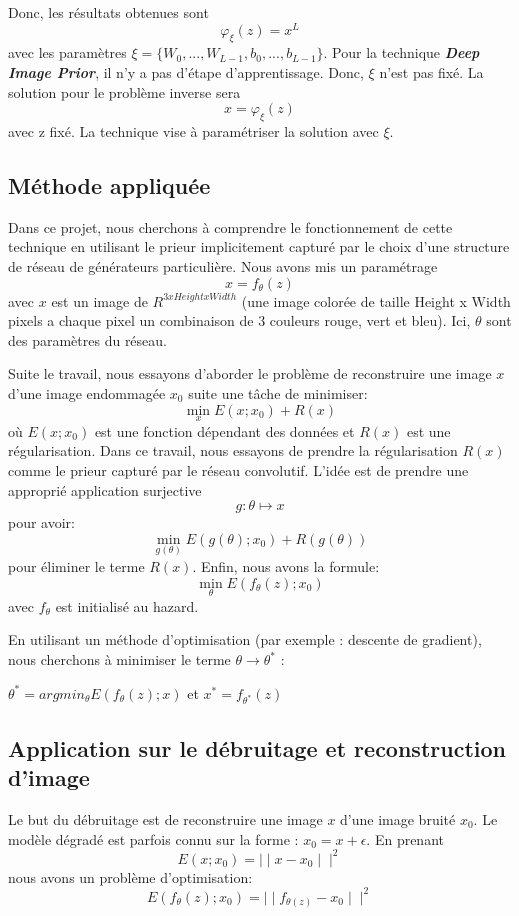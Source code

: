 \documentclass[
  12pt,
  dvipsnames]{article}
\begin{document}
Donc, les résultats obtenues sont \[\varphi_\xi(z) = x^L\] avec les paramètres \(\xi = \{W_0,...,W_{L-1},b_0,...,b_{L-1}\}\).
Pour la technique \textbf{\emph{Deep Image Prior}}, il n'y a pas d'étape d'apprentissage. Donc, \(\xi\) n'est pas fixé.
La solution pour le problème inverse sera \[x=\varphi_\xi(z)\] avec z fixé. La technique vise à paramétriser la solution avec \(\xi\).

\hypertarget{muxe9thode-appliquuxe9e}{%
\subsection{Méthode appliquée}\label{muxe9thode-appliquuxe9e}}

Dans ce projet, nous cherchons à comprendre le fonctionnement de cette technique
en utilisant le prieur implicitement capturé par le choix d'une structure de réseau de générateurs particulière.
Nous avons mis un paramétrage \[x = f_\theta(z)\] avec \(x\) est un image de \(R^{3xHeightxWidth}\) (une image colorée de taille
Height x Width pixels a chaque pixel un combinaison de 3 couleurs rouge, vert et bleu).
Ici, \(\theta\) sont des paramètres du réseau.

Suite le travail, nous essayons d'aborder le problème de reconstruire une image \(x\) d'une image endommagée \(x_0\) suite une tâche de minimiser: \[\min_{x} E(x;x_0) + R(x)\] où \(E(x;x_0)\) est une fonction dépendant des données et \(R(x)\) est une régularisation. Dans ce travail, nous essayons de prendre la régularisation \(R(x)\) comme le prieur capturé par le réseau convolutif. L'idée est de prendre une approprié application surjective \[g: \theta \mapsto x\] pour avoir: \[\min_{g(\theta)} E(g(\theta);x_0) + R(g(\theta))\] pour éliminer le terme \(R(x)\). Enfin, nous avons la formule: \[\min_{\theta} E(f_{\theta}(z);x_0)\] avec \(f_{\theta}\) est initialisé au hazard.

En utilisant un méthode d'optimisation (par exemple : descente de gradient), nous cherchons à minimiser le terme \(\theta \rightarrow \theta^*\) :

\begin {center} $\theta ^* = argmin_{\theta} E(f_{\theta}(z);x)$ et $x^* = f_{\theta^*}(z)$ \end {center}

\hypertarget{application-sur-le-duxe9bruitage-et-reconstruction-dimage}{%
\subsection{Application sur le débruitage et reconstruction d'image}\label{application-sur-le-duxe9bruitage-et-reconstruction-dimage}}

Le but du débruitage est de reconstruire une image \(x\) d'une image bruité \(x_0\). Le modèle dégradé est parfois connu sur la forme : \(x_0 = x + \epsilon\). En prenant \[ E(x;x_{0})= \mid\mid x - x_{0} \mid\mid^2 \] nous avons un problème d'optimisation: \[ E(f_{\theta}(z);x_{0})= \mid\mid f_{\theta(z)} - x_{0} \mid\mid^2 \]

\newpage

\printbibliography
\end{document}

